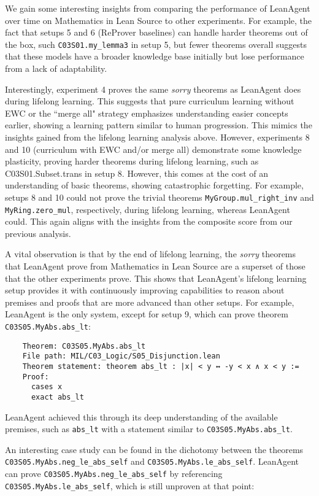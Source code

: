 \documentclass{article} %
\begin{document}
We gain some interesting insights from comparing the performance of LeanAgent over time on Mathematics in Lean Source to other experiments. For example, the fact that setups 5 and 6 (ReProver baselines) can handle harder theorems out of the box, such \texttt{C03S01.my\_lemma3} in setup 5, but fewer theorems overall suggests that these models have a broader knowledge base initially but lose performance from a lack of adaptability.

Interestingly, experiment 4 proves the same \textit{sorry} theorems as LeanAgent does during lifelong learning. This suggests that pure curriculum learning without EWC or the ``merge all" strategy emphasizes understanding easier concepts earlier, showing a learning pattern similar to human progression. This mimics the insights gained from the lifelong learning analysis above. However, experiments 8 and 10 (curriculum with EWC and/or merge all) demonstrate some knowledge plasticity, proving harder theorems during lifelong learning, such as C03S01.Subset.trans in setup 8. However, this comes at the cost of an understanding of basic theorems, showing catastrophic forgetting. For example, setups 8 and 10 could not prove the trivial theorems \texttt{MyGroup.mul\_right\_inv} and \texttt{MyRing.zero\_mul}, respectively, during lifelong learning, whereas LeanAgent could. This again aligns with the insights from the composite score from our previous analysis.

A vital observation is that by the end of lifelong learning, the \textit{sorry} theorems that LeanAgent prove from Mathematics in Lean Source are a superset of those that the other experiments prove. This shows that LeanAgent's lifelong learning setup provides it with continuously improving capabilities to reason about premises and proofs that are more advanced than other setups. For example, LeanAgent is the only system, except for setup 9, which can prove theorem \texttt{C03S05.MyAbs.abs\_lt}:

\begin{verbatim}
    Theorem: C03S05.MyAbs.abs_lt
    File path: MIL/C03_Logic/S05_Disjunction.lean
    Theorem statement: theorem abs_lt : |x| < y ↔ -y < x ∧ x < y :=
    Proof:
      cases x
      exact abs_lt
\end{verbatim}

LeanAgent achieved this through its deep understanding of the available premises, such as \texttt{abs\_lt} with a statement similar to \texttt{C03S05.MyAbs.abs\_lt}.

An interesting case study can be found in the dichotomy between the theorems \texttt{C03S05.MyAbs.neg\_le\_abs\_self} and \texttt{C03S05.MyAbs.le\_abs\_self}. LeanAgent can prove \texttt{C03S05.MyAbs.neg\_le\_abs\_self} by referencing \texttt{C03S05.MyAbs.le\_abs\_self}, which is still unproven at that point:
\end{document}
